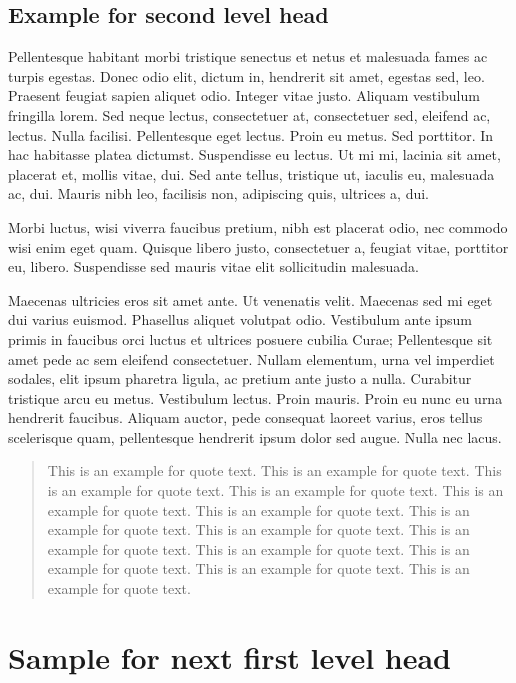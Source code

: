 \documentclass[AMA,STIX1COL]{WileyNJD-SP}
\begin{document}
\subsection{Example for second level head}

Pellentesque habitant morbi tristique senectus et netus et malesuada fames ac turpis egestas. Donec odio elit, dictum
in, hendrerit sit amet, egestas sed, leo. Praesent feugiat sapien aliquet odio. Integer vitae justo. Aliquam vestibulum
fringilla lorem. Sed neque lectus, consectetuer at, consectetuer sed, eleifend ac, lectus. Nulla facilisi. Pellentesque
eget lectus. Proin eu metus. Sed porttitor. In hac habitasse platea dictumst. Suspendisse eu lectus. Ut mi mi, lacinia
sit amet, placerat et, mollis vitae, dui. Sed ante tellus, tristique ut, iaculis eu, malesuada ac, dui. Mauris nibh leo,
facilisis non, adipiscing quis, ultrices a, dui.

Morbi luctus, wisi viverra faucibus pretium, nibh est placerat odio, nec commodo wisi enim eget quam. Quisque
libero justo, consectetuer a, feugiat vitae, porttitor eu, libero. Suspendisse sed mauris vitae elit sollicitudin malesuada.

Maecenas ultricies eros sit amet ante. Ut venenatis velit. Maecenas sed mi eget dui varius euismod. Phasellus aliquet
volutpat odio. Vestibulum ante ipsum primis in faucibus orci luctus et ultrices posuere cubilia Curae; Pellentesque sit
amet pede ac sem eleifend consectetuer. Nullam elementum, urna vel imperdiet sodales, elit ipsum pharetra ligula,
ac pretium ante justo a nulla. Curabitur tristique arcu eu metus. Vestibulum lectus. Proin mauris. Proin eu nunc eu
urna hendrerit faucibus. Aliquam auctor, pede consequat laoreet varius, eros tellus scelerisque quam, pellentesque
hendrerit ipsum dolor sed augue. Nulla nec lacus.

\begin{quote}
This is an example\cite{Burton2013,Berndt2011,Kucharik2012} for quote text. This is an example for quote text. This is an example for quote text. This is an example for quote text.\cite{Breil2015} This is an example for quote text. This is an example for quote text. This is an example for quote text. This is an example for quote text. This is an example for quote text. This is an example for quote text.\cite{Barth1997} This is an example for quote text. This is an example for quote text. This is an example for quote text. 
\end{quote}

\section{Sample for next first level head}\label{sec3}
\end{document}
